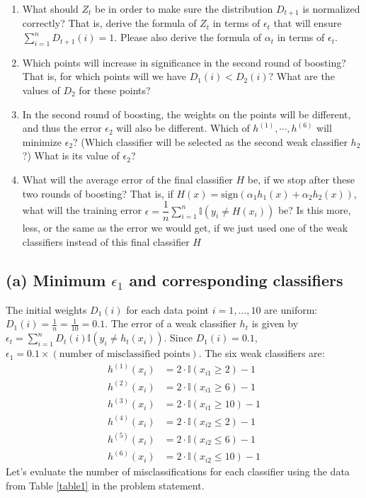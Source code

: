 \begin{itemize}
\begin{enumerate}
    \item[(2)] What should $Z_{t}$ be in order to make sure the distribution $D_{t+1}$ is normalized correctly? That is, derive the formula of $Z_{t}$ in terms of $\epsilon_{t}$ that will ensure $\sum\limits_{i=1}^{n} D_{t+1}(i) = 1$. Please also derive the formula of $\alpha_{t}$ in terms of $\epsilon_{t}$. ~

    \item[(3)] Which points will increase in significance in the second round of boosting? That is, for which points will we have $D_{1}(i) < D_{2}(i)$? What are the values of $D_{2}$ for these points? ~

    \item[(4)] In the second round of boosting, the weights on the points will be different, and thus the error $\epsilon_2$ will also be different. Which of $h^{(1)}, \cdots, h^{(6)}$ will minimize $\epsilon_2$? (Which classifier will be selected as the second weak classifier $h_2$?) What is its value of $\epsilon_2$? ~

    \item[(5)] What will the average error of the final classifier $H$ be, if we stop after these two rounds of boosting? That is, if $H(x) = \text{sign}(\alpha_{1}h_{1}(x) + \alpha_{2}h_{2}(x))$, what will the  training error $\epsilon = \dfrac{1}{n} \sum\limits_{i=1}^{n} \mathbb{I} (y_{i} \neq H(x_{i}))$ be? Is this more, less, or the same as the error we would get, if we just used one of the weak classifiers instead of this final classifier $H$ ~

\end{enumerate}
\end{itemize}

\solution
\subsection*{(a) Minimum $\epsilon_1$ and corresponding classifiers}
The initial weights $D_1(i)$ for each data point $i=1, \ldots, 10$ are uniform: $D_1(i) = \frac{1}{n} = \frac{1}{10} = 0.1$.
The error of a weak classifier $h_t$ is given by $\epsilon_t = \sum_{i=1}^{n} D_t(i) \mathbb{I}(y_i \neq h_t(x_i))$.
Since $D_1(i) = 0.1$, $\epsilon_1 = 0.1 \times (\text{number of misclassified points})$.
The six weak classifiers are:
\begin{align*}
h^{(1)}(x_{i}) &= 2 \cdot \mathbb{I}(x_{i1} \geq 2) - 1 \\
h^{(2)}(x_{i}) &= 2 \cdot \mathbb{I}(x_{i1} \geq 6) - 1 \\
h^{(3)}(x_{i}) &= 2 \cdot \mathbb{I}(x_{i1} \geq 10) - 1 \\
h^{(4)}(x_{i}) &= 2 \cdot \mathbb{I}(x_{i2} \leq 2) - 1 \\
h^{(5)}(x_{i}) &= 2 \cdot \mathbb{I}(x_{i2} \leq 6) - 1 \\
h^{(6)}(x_{i}) &= 2 \cdot \mathbb{I}(x_{i2} \leq 10) - 1
\end{align*}
Let's evaluate the number of misclassifications for each classifier using the data from Table \ref{table1} in the problem statement.

